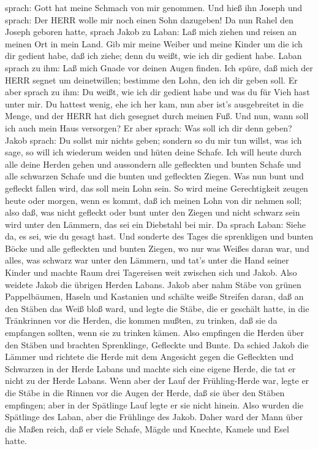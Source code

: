 sprach: Gott hat meine Schmach von mir genommen.  Und hieß
ihn Joseph und sprach: Der HERR wolle mir noch einen Sohn dazugeben!
 Da nun Rahel den Joseph geboren hatte, sprach Jakob zu
Laban: Laß mich ziehen und reisen an meinen Ort in mein Land.
 Gib mir meine Weiber und meine Kinder um die ich dir
gedient habe, daß ich ziehe; denn du weißt, wie ich dir gedient habe.
 Laban sprach zu ihm: Laß mich Gnade vor deinen Augen
finden. Ich spüre, daß mich der HERR segnet um deinetwillen;
 bestimme den Lohn, den ich dir geben soll. 
Er aber sprach zu ihm: Du weißt, wie ich dir gedient habe und was du für
Vieh hast unter mir.  Du hattest wenig, ehe ich her kam,
nun aber ist's ausgebreitet in die Menge, und der HERR hat dich gesegnet
durch meinen Fuß. Und nun, wann soll ich auch mein Haus versorgen?
 Er aber sprach: Was soll ich dir denn geben? Jakob sprach:
Du sollst mir nichts geben; sondern so du mir tun willst, was ich sage,
so will ich wiederum weiden und hüten deine Schafe.  Ich
will heute durch alle deine Herden gehen und aussondern alle gefleckten
und bunten Schafe und alle schwarzen Schafe und die bunten und
gefleckten Ziegen. Was nun bunt und gefleckt fallen wird, das soll mein
Lohn sein.  So wird meine Gerechtigkeit zeugen heute oder
morgen, wenn es kommt, daß ich meinen Lohn von dir nehmen soll; also
daß, was nicht gefleckt oder bunt unter den Ziegen und nicht schwarz
sein wird unter den Lämmern, das sei ein Diebstahl bei mir.
 Da sprach Laban: Siehe da, es sei, wie du gesagt hast.
 Und sonderte des Tages die sprenkligen und bunten Böcke
und alle gefleckten und bunten Ziegen, wo nur was Weißes daran war, und
alles, was schwarz war unter den Lämmern, und tat's unter die Hand
seiner Kinder  und machte Raum drei Tagereisen weit
zwischen sich und Jakob. Also weidete Jakob die übrigen Herden Labans.
 Jakob aber nahm Stäbe von grünen Pappelbäumen, Haseln und
Kastanien und schälte weiße Streifen daran, daß an den Stäben das Weiß
bloß ward,  und legte die Stäbe, die er geschält hatte, in
die Tränkrinnen vor die Herden, die kommen mußten, zu trinken, daß sie
da empfangen sollten, wenn sie zu trinken kämen.  Also
empfingen die Herden über den Stäben und brachten Sprenklinge, Gefleckte
und Bunte.  Da schied Jakob die Lämmer und richtete die
Herde mit dem Angesicht gegen die Gefleckten und Schwarzen in der Herde
Labans und machte sich eine eigene Herde, die tat er nicht zu der Herde
Labans.  Wenn aber der Lauf der Frühling-Herde war, legte
er die Stäbe in die Rinnen vor die Augen der Herde, daß sie über den
Stäben empfingen;  aber in der Spätlinge Lauf legte er sie
nicht hinein. Also wurden die Spätlinge des Laban, aber die Frühlinge
des Jakob.  Daher ward der Mann über die Maßen reich, daß
er viele Schafe, Mägde und Knechte, Kamele und Esel hatte.

